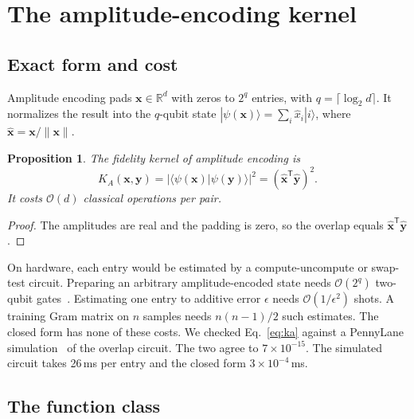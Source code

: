 \documentclass[pdflatex,sn-mathphys-num,lineno]{sn-jnl}
\theoremstyle{thmstyleone}
\newtheorem{proposition}{Proposition}
\begin{document}
\section{The amplitude-encoding kernel}
\label{sec:theory}

\subsection{Exact form and cost}

Amplitude encoding pads $\mathbf{x}\in\mathbb{R}^d$ with zeros to $2^q$ entries,
with $q=\lceil\log_2 d\rceil$. It normalizes the result into the $q$-qubit state
$|\psi(\mathbf{x})\rangle=\sum_i \hat{x}_i|i\rangle$, where
$\hat{\mathbf{x}}=\mathbf{x}/\|\mathbf{x}\|$.

\begin{proposition}\label{prop:exact}
The fidelity kernel of amplitude encoding is
\begin{equation}
K_A(\mathbf{x},\mathbf{y}) = |\langle\psi(\mathbf{x})|\psi(\mathbf{y})\rangle|^2
= (\hat{\mathbf{x}}^{\mathsf{T}}\hat{\mathbf{y}})^2 .
\label{eq:ka}
\end{equation}
It costs $\mathcal{O}(d)$ classical operations per pair.
\end{proposition}
\begin{proof}
The amplitudes are real and the padding is zero, so the overlap equals
$\hat{\mathbf{x}}^{\mathsf{T}}\hat{\mathbf{y}}$.
\end{proof}

On hardware, each entry would be estimated by a compute-uncompute or swap-test
circuit. Preparing an arbitrary amplitude-encoded state needs $\mathcal{O}(2^q)$
two-qubit gates~\cite{mottonen2005transformation}. Estimating one entry to
additive error $\epsilon$ needs $\mathcal{O}(1/\epsilon^2)$ shots. A training Gram
matrix on $n$ samples needs $n(n-1)/2$ such estimates. The closed form has none of
these costs. We checked Eq.~\eqref{eq:ka} against a PennyLane
simulation~\cite{bergholm2018pennylane} of the overlap circuit. The two agree to
$7\times10^{-15}$. The simulated circuit takes 26\,ms per entry and the closed form
$3\times10^{-4}$\,ms.

\subsection{The function class}
\end{document}
